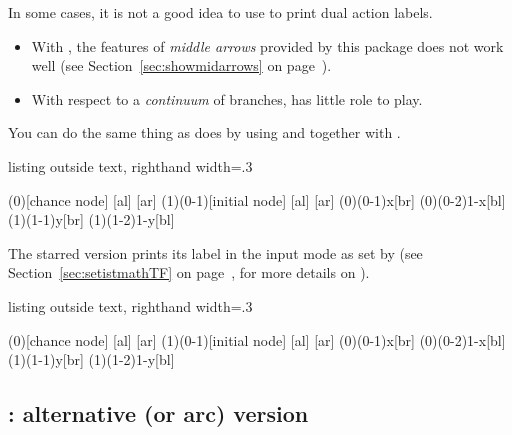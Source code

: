 \remark
In some cases, it is not a good idea to use \cmd{\istB} to print dual action labels.
\begin{itemize}\tightlist
\item With \cmd{\istB}, the features of \emph{middle arrows} provided by this package does not work well (see Section~\ref{sec:showmidarrows} on page~\pageref{sec:showmidarrows}).
\label{page:noistB}

\item With respect to a \emph{continuum} of branches, \cmd{\istB} has little role to play.
\end{itemize}

You can do the same thing as \cmd{\istB} does by using \cmd{\istb} and together with \cmd{\xtActionLabel}.

\begin{tcblisting}{listing outside text, righthand width=.3\linewidth}
\begin{istgame}[font=\footnotesize]
\xtdistance{15mm}{30mm}
\istroot(0)[chance node]
  [al]
  [ar]
  \endist
\istroot(1)(0-1)[initial node]
  [al]
  [ar]
  \endist
\xtActionLabel(0)(0-1){x}[br]
\xtActionLabel(0)(0-2){1-x}[bl]
\xtActionLabel(1)(1-1){y}[br]
(1)(1-2){1-y}[bl]
\end{istgame}
\end{tcblisting}

The starred version \cmd{\xtActionLabel*} prints its label in the input mode as set by \cmd{\setistmathTF*} (see Section~\ref{sec:setistmathTF} on page~\pageref{sec:setistmathTF}, for more details on \cmd{\setistmatTF}).

\begin{tcblisting}{listing outside text, righthand width=.3\linewidth}
\begin{istgame}[font=\footnotesize]
\xtdistance{15mm}{30mm}
\istroot(0)[chance node]
  [al]
  [ar]
  \endist
\istroot(1)(0-1)[initial node]
  [al]
  [ar]
  \endist
\xtActionLabel(0)(0-1){x}[br]
\xtActionLabel(0)(0-2){1-x}[bl]
\xtActionLabel*(1)(1-1){y}[br]
(1)(1-2){1-y}[bl]
\end{istgame}
\end{tcblisting}


\subsection{\protect\cmd{\istbA}: alternative (or arc) version}
\label{sec:istbA}

